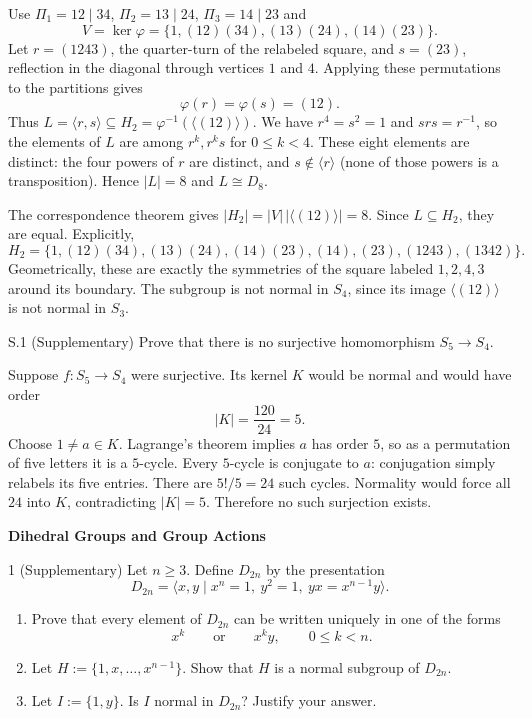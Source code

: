 \documentclass[11pt]{article}
\newcommand{\sectionheading}[1]{%
  \Needspace{8\baselineskip}
  \vspace{0.25em}
  {\color{darkgray}\large\bfseries #1}\par
}
\begin{document}
\begin{solution}
Use $\Pi_1=12\mid34$, $\Pi_2=13\mid24$, $\Pi_3=14\mid23$ and
\[
 V=\ker\varphi=\{1,(12)(34),(13)(24),(14)(23)\}.
\]
Let $r=(1243)$, the quarter-turn of the relabeled square, and $s=(23)$, reflection in the diagonal through vertices $1$ and $4$. Applying these permutations to the partitions gives
\[
 \varphi(r)=\varphi(s)=(12).
\]
Thus $L=\langle r,s\rangle\subseteq H_2=\varphi^{-1}(\langle(12)\rangle)$. We have $r^4=s^2=1$ and $srs=r^{-1}$, so the elements of $L$ are among $r^k,r^ks$ for $0\leq k<4$. These eight elements are distinct: the four powers of $r$ are distinct, and $s\notin\langle r\rangle$ (none of those powers is a transposition). Hence $|L|=8$ and $L\cong D_8$.

The correspondence theorem gives $|H_2|=|V|\,|\langle(12)\rangle|=8$. Since $L\subseteq H_2$, they are equal. Explicitly,
\[
 \boxed{H_2=\{1,(12)(34),(13)(24),(14)(23),(14),(23),(1243),(1342)\}.}
\]
Geometrically, these are exactly the symmetries of the square labeled $1,2,4,3$ around its boundary. The subgroup is not normal in $S_4$, since its image $\langle(12)\rangle$ is not normal in $S_3$.
\end{solution}

\begin{exercise}{S.1 (Supplementary)}
Prove that there is no surjective homomorphism $S_5\to S_4$.
\end{exercise}

\begin{solution}
Suppose $f:S_5\to S_4$ were surjective. Its kernel $K$ would be normal and would have order
\[
 |K|=\frac{120}{24}=5.
\]
Choose $1\ne a\in K$. Lagrange's theorem implies $a$ has order $5$, so as a permutation of five letters it is a $5$-cycle. Every $5$-cycle is conjugate to $a$: conjugation simply relabels its five entries. There are $5!/5=24$ such cycles. Normality would force all $24$ into $K$, contradicting $|K|=5$. Therefore no such surjection exists.
\end{solution}

\sectionheading{Dihedral Groups and Group Actions}

\begin{exercise}{1 (Supplementary)}
Let $n\geq3$. Define $D_{2n}$ by the presentation
\[
  D_{2n}=\langle x,y\mid x^n=1,\ y^2=1,\ yx=x^{n-1}y\rangle.
\]

\begin{enumerate}[label=\textbf{(\alph*)}]
	\item Prove that every element of $D_{2n}$ can be written uniquely in one of
	the forms
	\[
	x^k \qquad\text{or}\qquad x^k y,
	\qquad 0\leq k<n.
	\] 

	\item Let $H:=\{1,x,\ldots,x^{n-1}\}$. Show that $H$ is a normal subgroup of $D_{2n}$.

	\item Let $I:=\{1,y\}$. Is $I$ normal in $D_{2n}$? Justify your answer.


	\end{enumerate}


\end{exercise}
\end{document}
